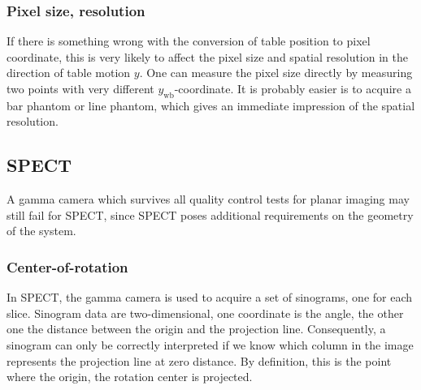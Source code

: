 \subsubsection{Pixel size, resolution}
If there is something wrong with the conversion of table position to pixel
coordinate, this is very likely to affect the pixel size and spatial
resolution in the direction of table motion $y$. One can measure the pixel
size directly by measuring two points with very different
$y_{\mbox{wb}}$-coordinate. It is probably easier is to acquire a bar phantom
or line phantom, which gives an immediate impression of the spatial
resolution.


\subsection{SPECT}
A gamma camera which survives all quality control tests for planar
imaging may still fail for SPECT, since SPECT poses additional
requirements on the geometry of the system.

\subsubsection{Center-of-rotation}
In SPECT, the gamma camera is used to acquire a set of sinograms, one for each
slice. Sinogram data are two-dimensional, one coordinate is the angle, the
other one the distance between the origin and the projection
line. Consequently, a sinogram can only be correctly interpreted if we know
which column in the image represents the projection line at zero distance. By
definition, this is the point where the origin, the rotation center is
projected.

